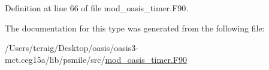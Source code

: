 Definition at line 66 of file mod\+\_\+oasis\+\_\+timer.\+F90.



The documentation for this type was generated from the following file\+:\begin{DoxyCompactItemize}
\item 
/\+Users/tcraig/\+Desktop/oasis/oasis3-\/mct.\+ceg15a/lib/psmile/src/\hyperlink{mod__oasis__timer_8_f90}{mod\+\_\+oasis\+\_\+timer.\+F90}\end{DoxyCompactItemize}
